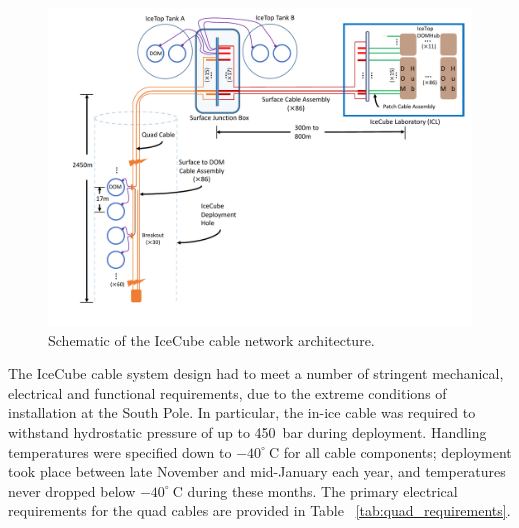 \begin{figure}
  \centering
  \includegraphics[width=\textwidth]{graphics/cables/cable_system_schematic.pdf}
  \caption{\label{fig:icecube-cables-logical}Schematic of the IceCube cable network architecture.}
\end{figure}

The IceCube cable system design had to meet a number of stringent
mechanical, electrical and functional requirements, due to the extreme
conditions of installation at the South Pole.  In particular, the in-ice cable
was required to withstand hydrostatic pressure of up to 450~bar during
deployment.  Handling temperatures were specified down to $-40^{\circ}\ \mathrm{C}$ for all 
cable components; deployment took place between late November and
mid-January each year, and temperatures never dropped below
$-40^{\circ}\ \mathrm{C}$ during these months.  The primary electrical requirements for the quad
cables are provided in Table ~\ref{tab:quad_requirements}.

